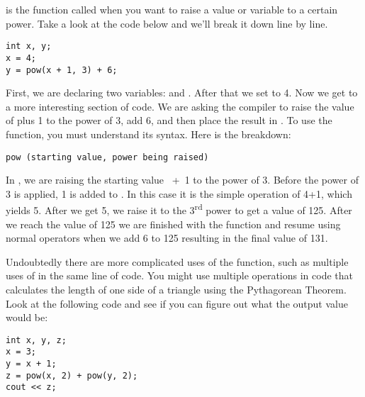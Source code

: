 
 is the function called when you want to raise a value or variable to a certain power. 
Take a look at the code below and we'll break it down line by line.

\noindent\begin{minipage}{\linewidth}\begin{lstlisting}
int x, y;
x = 4;
y = pow(x + 1, 3) + 6;
\end{lstlisting}\end{minipage}

	First, we are declaring two variables:  and . 
	After that we set  to 4. 
	Now we get to a more interesting section of code. 
	We are asking the compiler to raise the value of  plus 1 to the power of 3, add 6, and then place the result in . 	
	To use the  function, you must understand its syntax. 
	Here is the breakdown:

\noindent\begin{minipage}{\linewidth}\begin{lstlisting}
pow (starting value, power being raised)
\end{lstlisting}\end{minipage}

 	In , we are raising the starting value ~+~1 to the power of 3. 
 	Before the power of 3 is applied, 1 is added to . 
 	In this case it is the simple operation of 4+1, which yields 5. 
 	After we get 5, we raise it to the 3\textsuperscript{rd} power to get a value of 125. 
 	After we reach the value of 125 we are finished with the  function and resume using normal operators when we add 6 to 125 resulting in the final value of 131.  
	
	Undoubtedly there are more complicated uses of the  function, such as multiple uses of  in the same line of code. 
	You might use multiple  operations in code that calculates the length of one side of a triangle using the Pythagorean Theorem. 
	Look at the following code and see if you can figure out what the output value would be:

\noindent\begin{minipage}{\linewidth}\begin{lstlisting}
int x, y, z;
x = 3;
y = x + 1;
z = pow(x, 2) + pow(y, 2);
cout << z;
\end{lstlisting}\end{minipage}

